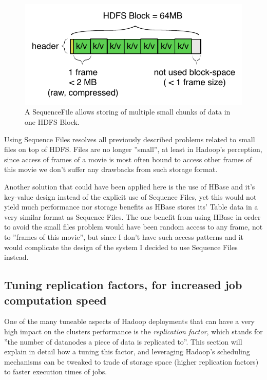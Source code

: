 \begin{figure}[ch!]
  \centering
  \includegraphics[scale=0.9]{diagrams/sequence-file.pdf}
  \caption{A SequenceFile allows storing of multiple small chunks of data in one HDFS Block.}
  \label{fig:sequence-file}
\end{figure}

Using Sequence Files resolves all previously described problems related to small files on top of HDFS. Files are no longer ''small'', at least in Hadoop's perception,
since access of frames of a movie is most often bound to access other frames of this movie we don't suffer any drawbacks from such storage format.

Another solution that could have been applied here is the use of HBase and it's key-value design instead of the explicit use of Sequence Files, yet this would not yield much performance nor storage benefits as HBase stores its' Table data in a very similar format as Sequence Files. The one benefit from using HBase in order to avoid the small files problem would have been random access to any frame, not to ''frames of this movie'', but since I don't have such access patterns and it would complicate the design of the system I decided to use Sequence Files instead.



\subsection{Tuning replication factors, for increased job computation speed}
\label{sec:tuning-replication-factors}
One of the many tuneable aspects of Hadoop deployments that can have a very high impact on the clusters performance is the \textit{replication factor}, which stands for ''the number of datanodes a piece of data is replicated to''. This section will explain in detail how a tuning this factor, and leveraging Hadoop's scheduling mechanisms can be tweaked to trade of storage space (higher replication factors) to faster execution times of jobs.

